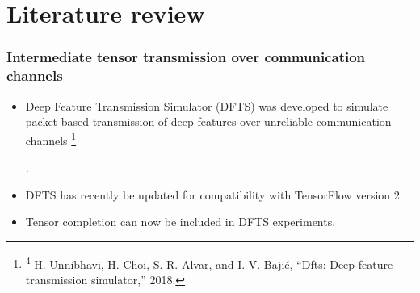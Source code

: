 \documentclass[aspectratio=169]{beamer}
\newcommand\blfootnote[1]{%
	\begingroup
	\renewcommand\thefootnote{}\footnote{#1}%
	\addtocounter{footnote}{-1}%
	\endgroup
}
\begin{document}

\section{Literature review}

\begin{frame}
\frametitle{Intermediate tensor transmission over communication channels}
	\begin{itemize}
	\item Deep Feature Transmission Simulator (DFTS) was developed to simulate packet-based transmission of deep features over unreliable communication channels \blfootnote{\tiny \textsuperscript{4} H. Unnibhavi, H. Choi, S. R. Alvar, and I. V. Bajić, “Dfts: Deep feature transmission simulator,” 2018.} \cite{unnibhavi2018dfts}.
		\item DFTS has recently be updated for compatibility with TensorFlow version 2.
		\item Tensor completion can now be included in DFTS experiments.
	\end{itemize}
\end{frame}
\end{document}
